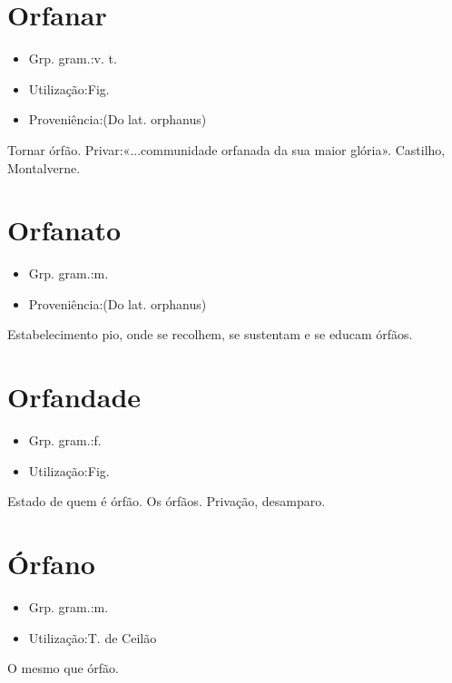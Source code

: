 \section{Orfanar}
\begin{itemize}
\item {Grp. gram.:v. t.}
\end{itemize}
\begin{itemize}
\item {Utilização:Fig.}
\end{itemize}
\begin{itemize}
\item {Proveniência:(Do lat. \textunderscore orphanus\textunderscore )}
\end{itemize}
Tornar órfão.
Privar:«\textunderscore ...communidade orfanada da sua maior glória\textunderscore ». Castilho, \textunderscore Montalverne\textunderscore .
\section{Orfanato}
\begin{itemize}
\item {Grp. gram.:m.}
\end{itemize}
\begin{itemize}
\item {Proveniência:(Do lat. \textunderscore orphanus\textunderscore )}
\end{itemize}
Estabelecimento pio, onde se recolhem, se sustentam e se educam órfãos.
\section{Orfandade}
\begin{itemize}
\item {Grp. gram.:f.}
\end{itemize}
\begin{itemize}
\item {Utilização:Fig.}
\end{itemize}
Estado de quem é órfão.
Os órfãos.
Privação, desamparo.
\section{Órfano}
\begin{itemize}
\item {Grp. gram.:m.}
\end{itemize}
\begin{itemize}
\item {Utilização:T. de Ceilão}
\end{itemize}
O mesmo que \textunderscore órfão\textunderscore .
